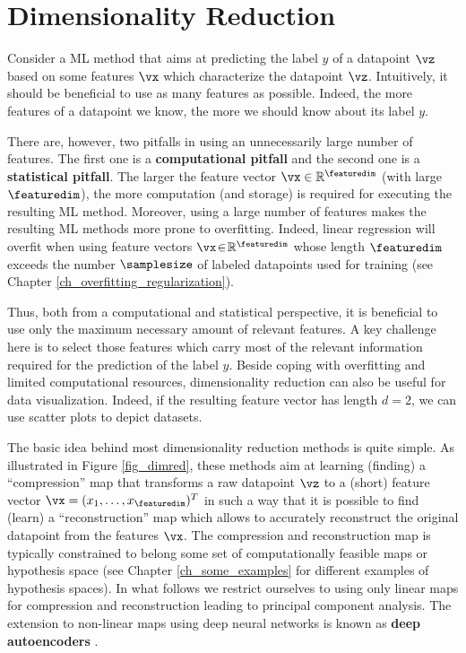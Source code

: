 \documentclass[12pt]{report}
\begin{document}
\section{Dimensionality Reduction} 
\label{sec_dim_red}

Consider a ML method that aims at predicting the label $y$ of a datapoint $\vz$ 
based on some features $\vx$ which characterize the datapoint $\vz$. Intuitively, it 
should be beneficial to use as many features as possible. Indeed, the more features 
of a datapoint we know, the more we should know about its label $y$. 

There are, however, two pitfalls in using an unnecessarily large number of features. 
The first one is a {\bf computational pitfall} and the second one is a {\bf statistical pitfall}. 
The larger the feature vector $\vx \in \mathbb{R}^{\featuredim}$ (with large $\featuredim$), 
the more computation (and storage) is required for executing the resulting ML method. 
Moreover, using a large number of features makes the resulting ML methods more prone to 
overfitting. Indeed, linear regression will overfit when using feature vectors $\vx\!\in\!\mathbb{R}^{\featuredim}$ 
whose length $\featuredim$ exceeds the number $\samplesize$ of labeled datapoints used 
for training (see Chapter \ref{ch_overfitting_regularization}). 

Thus, both from a computational and statistical perspective, it is beneficial to use 
only the maximum necessary amount of relevant features. A key challenge here is 
to select those features which carry most of the relevant information required for 
the prediction of the label $y$. Beside coping with overfitting and limited computational 
resources, dimensionality reduction can also be useful for data visualization. Indeed, if 
the resulting feature vector has length $d=2$, we can use scatter plots to depict datasets. 

The basic idea behind most dimensionality reduction methods is quite simple. As 
illustrated in Figure \ref{fig_dimred}, these methods aim at learning (finding) a ``compression'' 
map that transforms a raw datapoint $\vz$ to a (short) feature vector $\vx=(x_{1},\ldots,x_{\featuredim})^{T}$ 
in such a way that it is possible to find (learn) a ``reconstruction'' map which allows to accurately 
reconstruct the original datapoint from the features $\vx$. The compression and reconstruction 
map is typically constrained to belong some set of computationally feasible maps or hypothesis 
space (see Chapter \ref{ch_some_examples} for different examples of hypothesis spaces). In what 
follows we restrict ourselves to using only linear maps for compression and reconstruction leading 
to principal component analysis. The extension to non-linear maps using deep neural networks 
is known as {\bf deep autoencoders} \cite[Ch. 14]{Goodfellow-et-al-2016}. 
\end{document}
